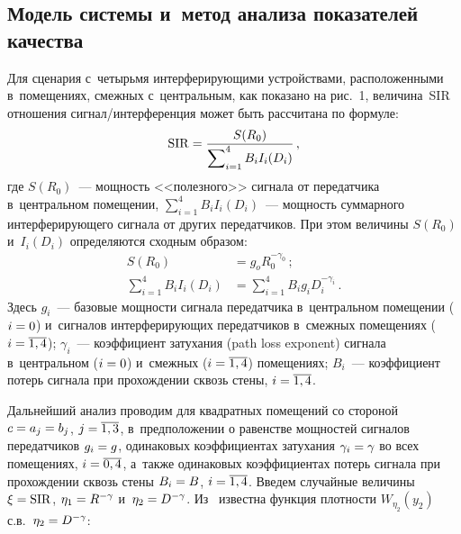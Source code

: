 \begin{multicols}{2}
\section{Модель системы и~метод анализа показателей качества}

  Для сценария с~четырьмя интерферирующими устройствами, 
расположенными в~помещениях, смежных с~центральным, как показано на 
рис.~1, величина~SIR отношения сиг\-нал/ин\-тер\-фе\-рен\-ция может 
быть рассчитана по формуле:
  \begin{equation}
  \mathrm{SIR}= \displaystyle\frac{\displaystyle S(R_0)\mathstrut}{\displaystyle \sum\nolimits_{i=1}^4 B_i I_i(D_i)\mathstrut}\,,
  \label{e1-gai}
\end{equation}
где $S(R_0)$~--- мощность <<полезного>> сигнала от передатчика 
в~центральном помещении, $\sum\nolimits_{i=1}^4 B_iI_i(D_i)$~--- мощность 
суммарного интерферирующего сигнала от других передатчиков.
%
При этом величины $S(R_0)$ и~$I_i(D_i)$ определяются сходным образом:
\begin{align}
S(R_0)&= g_o R_0^{-\gamma_0}\,;\label{e2-gai}\\
\sum\limits_{i=1}^4 B_i I_i(D_i) &= \sum\limits_{i=1}^4 B_i g_i  
D_i^{-\gamma_i}\,.\label{e3-gai}
\end{align}
  Здесь $g_i$~--- базовые мощности сигнала передатчика в~центральном 
помещении ($i\hm=0$) и~сигналов интерферирующих передатчиков 
в~смежных помещениях ($i\hm=\overline{1,4}$); $\gamma_i$~--- 
коэффициент затухания
 (path loss exponent) сигнала в~центральном 
($i\hm=0$)
 и~смежных ($i\hm=\overline{1,4}$) помещениях; $B_i$~--- 
коэффициент потерь сигнала при прохождении сквозь стены, 
$i\hm=\overline{1,4}$.
  
  Дальнейший анализ проводим для квадратных помещений со стороной 
$c\hm= a_j\hm= b_j$, $j\hm=\overline{1,3}$, в~предположении о равенстве 
мощностей сигналов передатчиков $g_i\hm=g$, одинаковых коэффициентах 
затухания $\gamma_i\hm=\gamma$ во всех помещениях, 
$i\hm=\overline{0,4}$, а~также одинаковых коэффициентах потерь сигнала 
при прохождении сквозь стены $B_i\hm=B$, $i\hm=\overline{1,4}$. Введем 
случайные величины $\xi\hm= \mathrm{SIR}$, $\eta_1\hm= R^{-\gamma}$ и~$\eta_2\hm= 
D^{-\gamma}$. Из~\cite{14-gai} известна функция плотности 
$W_{\eta_2}(y_2)$ с.в.\ $\eta_2\hm= D^{-\gamma}$:


\end{multicols}

